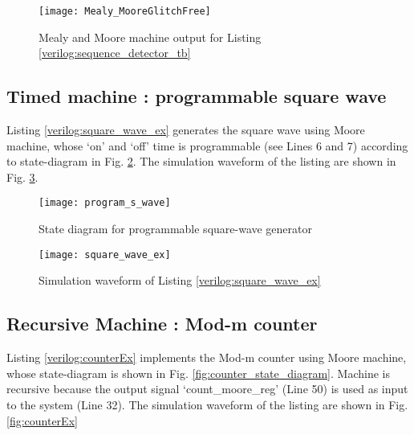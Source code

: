 \begin{figure}[!h]
	\centering
	\texttt{[image: Mealy\_MooreGlitchFree]}
	\caption{Mealy and Moore machine output for Listing \ref{verilog:sequence_detector_tb}}
	\label{fig:Mealy_MooreGlitchFree}
\end{figure}






\subsection{Timed machine : programmable square wave }
Listing \ref{verilog:square_wave_ex} generates the square wave using Moore machine, whose `on' and `off' time is programmable (see Lines 6 and 7) according to state-diagram in Fig. \ref{fig:program_s_wave}.  The simulation waveform of the listing are shown in Fig. \ref{fig:square_wave_ex}.

\begin{figure}[!h]
	\centering
	\texttt{[image: program\_s\_wave]}
	\caption{State diagram for programmable square-wave generator}
	\label{fig:program_s_wave}
\end{figure}

\begin{figure}[!h]
	\centering
	\texttt{[image: square\_wave\_ex]}
	\caption{Simulation waveform of Listing \ref{verilog:square_wave_ex}}
	\label{fig:square_wave_ex}
\end{figure}




\subsection{Recursive Machine : Mod-m counter}
Listing \ref{verilog:counterEx} implements the Mod-m counter using Moore machine, whose state-diagram is shown in Fig. \ref{fig:counter_state_diagram}. Machine is recursive because the output signal `count\_moore\_reg' (Line 50) is used as input to the system (Line 32). The simulation waveform of the listing are shown in Fig. \ref{fig:counterEx}

